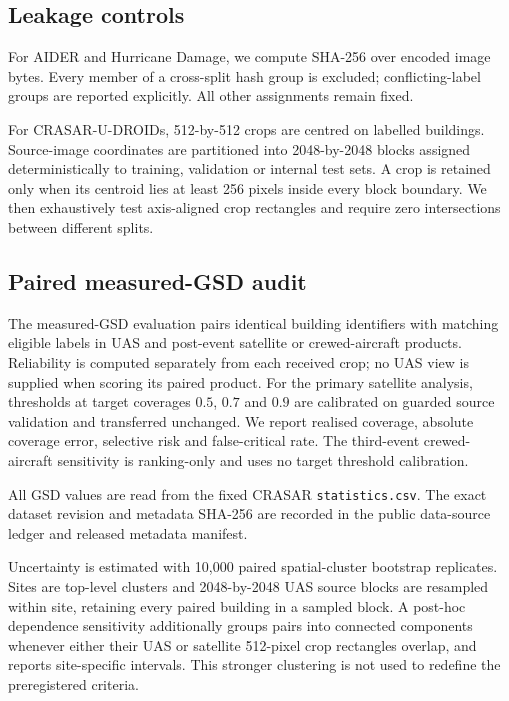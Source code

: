 \subsection{Leakage controls}

For AIDER and Hurricane Damage, we compute SHA-256 over encoded image bytes.
Every member of a cross-split hash group is excluded; conflicting-label groups
are reported explicitly. All other assignments remain fixed.

For CRASAR-U-DROIDs, 512-by-512 crops are centred on labelled buildings.
Source-image coordinates are partitioned into 2048-by-2048 blocks assigned
deterministically to training, validation or internal test sets. A crop is
retained only when its centroid lies at least 256 pixels inside every block
boundary. We then exhaustively test axis-aligned crop rectangles and require
zero intersections between different splits.

\subsection{Paired measured-GSD audit}

The measured-GSD evaluation pairs identical building identifiers with matching
eligible labels in UAS and post-event satellite or crewed-aircraft products.
Reliability is computed separately from each received crop; no UAS view is
supplied when scoring its paired product. For the primary satellite analysis,
thresholds at target coverages \(0.5\), \(0.7\) and \(0.9\) are calibrated on
guarded source validation and transferred unchanged. We report realised
coverage, absolute coverage error, selective risk and false-critical rate. The
third-event crewed-aircraft sensitivity is ranking-only and uses no target
threshold calibration.

All GSD values are read from the fixed CRASAR \texttt{statistics.csv}. The
exact dataset revision and metadata SHA-256 are recorded in the public
data-source ledger and released metadata manifest.

Uncertainty is estimated with 10,000 paired spatial-cluster bootstrap
replicates. Sites are top-level clusters and 2048-by-2048 UAS source blocks are
resampled within site, retaining every paired building in a sampled block.
A post-hoc dependence sensitivity additionally groups pairs into connected
components whenever either their UAS or satellite 512-pixel crop rectangles
overlap, and reports site-specific intervals. This stronger clustering is not
used to redefine the preregistered criteria.
